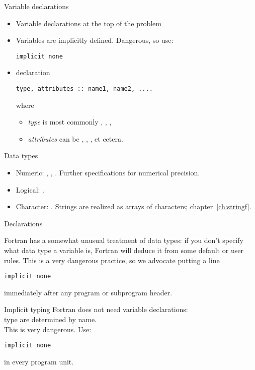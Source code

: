 \begin{slide}{Variable declarations}
  \label{sl:fvars}
  \begin{itemize}
  \item Variable declarations at the top of the problem
  \item Variables are implicitly defined. Dangerous, so use:
\begin{verbatim}
implicit none
\end{verbatim}
\item declaration
\begin{verbatim}
type, attributes :: name1, name2, ....
\end{verbatim}
where
\begin{itemize}
\item \textit{type} is most commonly , , ,
\item \textit{attributes} can be , ,
  ,  et cetera.
  \end{itemize}
\end{itemize}
\end{slide}

\begin{block}{Data types}
  \begin{itemize}
  \item Numeric: , ,
    . Further specifications for numerical precision.
  \item Logical: .
  \item Character: . Strings are realized as
    arrays of characters; chapter~\ref{ch:stringf}.
  \end{itemize}  
\end{block}

 {Declarations}
\label{sec:ftype}

Fortran has a somewhat unusual treatment of data types: if you don't
specify what data type a variable is, Fortran will deduce it from some
default or user rules. This is a very dangerous practice, so we
advocate putting a line
\begin{verbatim}
implicit none
\end{verbatim}
immediately after any program or subprogram header.

\begin{slide}{Implicit typing}
  \label{sl:fimplicit}
  Fortran does not need variable declarations:\\
  type are determined by name.\\
  This is very dangerous. Use:
\begin{verbatim}
implicit none
\end{verbatim}
  in every program unit.
\end{slide}

